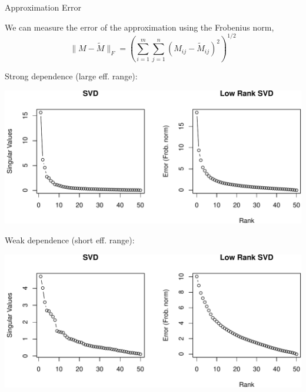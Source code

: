 \documentclass[11pt,ignorenonframetext,]{beamer}
\begin{document}
\begin{frame}{Approximation Error}

We can measure the error of the approximation using the Frobenius norm,
\[ \lVert M-\tilde M\rVert_F = \left( \sum_{i=1}^m\sum_{j=1}^n (M_{ij}-\tilde M_{ij})^2\right)^{1/2} \]

\pause

\vspace{3mm}

Strong dependence (large eff. range):

\vspace{2mm}

\includegraphics{Lec22_files/figure-beamer/unnamed-chunk-7-1.pdf}

\end{frame}

\begin{frame}{}

Weak dependence (short eff. range):

\vspace{2mm}

\includegraphics{Lec22_files/figure-beamer/unnamed-chunk-8-1.pdf}

\end{frame}
\end{document}
